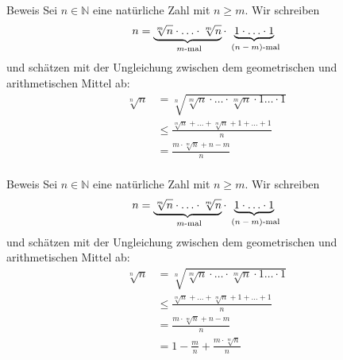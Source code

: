 \documentclass[10pt]{beamer}
\def\bN{\mathbb{N}}
\begin{document}
\begin{frame}{Beweis}
    Sei \( n \in \bN \) eine natürliche Zahl mit \( n \geq m \). Wir schreiben 
    \[
        n = \underbrace{\sqrt[m]{n} \cdot \ldots \cdot \sqrt[m]{n}}_{\text{ \( m \)-mal}} \cdot \underbrace{1 \cdot \ldots \cdot 1}_{\text{ \( \left( n - m \right) \)-mal}} 
    \]
    und schätzen mit der Ungleichung zwischen dem geometrischen und arithmetischen Mittel ab:
    \begin{align*}
       \sqrt[n]{n}
        & =\sqrt[n]{\sqrt[m]{n} \cdot \ldots \cdot \sqrt[m]{n} \cdot 1 \ldots \cdot 1} \\
        & \leq \frac{\sqrt[m]{n} + \ldots + \sqrt[m]{n} + 1 + \ldots + 1}{n} \\
        & = \frac{m \cdot \sqrt[m]{n} + n - m}{n} \\
    \end{align*}
\end{frame}



\begin{frame}{Beweis}
    Sei \( n \in \bN \) eine natürliche Zahl mit \( n \geq m \). Wir schreiben 
    \[
        n = \underbrace{\sqrt[m]{n} \cdot \ldots \cdot \sqrt[m]{n}}_{\text{ \( m \)-mal}} \cdot \underbrace{1 \cdot \ldots \cdot 1}_{\text{ \( \left( n - m \right) \)-mal}} 
    \]
    und schätzen mit der Ungleichung zwischen dem geometrischen und arithmetischen Mittel ab:
    \begin{align*}
        \sqrt[n]{n}
        & =\sqrt[n]{\sqrt[m]{n} \cdot \ldots \cdot \sqrt[m]{n} \cdot 1 \ldots \cdot 1} \\
        & \leq \frac{\sqrt[m]{n} + \ldots + \sqrt[m]{n} + 1 + \ldots + 1}{n} \\
        & = \frac{m \cdot \sqrt[m]{n} + n - m}{n} \\
        & = 1 - \frac{m}{n} + \frac{m \cdot \sqrt[m]{n}}{n} \\
    \end{align*}
\end{frame}
\end{document}

